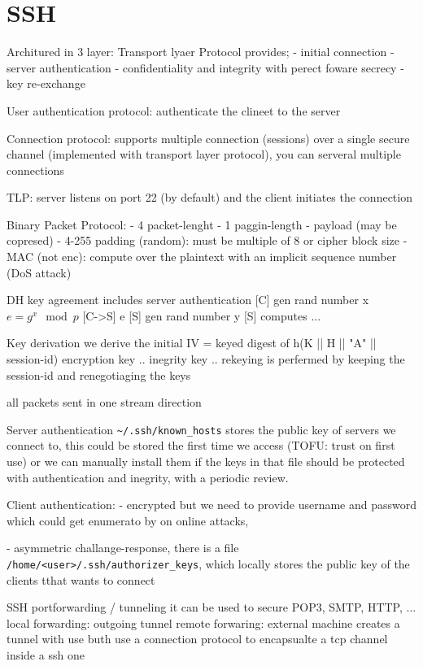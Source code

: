\documentclass[12pt]{article}
\begin{document}
\section{SSH}
Architured in 3 layer:
Transport lyaer Protocol provides;
- initial connection
- server authentication
- confidentiality and integrity with perect foware secrecy
- key re-exchange

User authentication protocol:
authenticate the clineet to the server

Connection protocol:
supports multiple connection (sessions) over a single secure channel (implemented with transport layer protocol), you can serveral multiple connections

TLP:
server listens on port 22 (by default) and the client initiates the connection

Binary Packet Protocol:
- 4 packet-lenght
- 1 paggin-length
- payload (may be copresed)
- 4-255 padding (random): must be multiple of 8 or cipher block size
- MAC (not enc): compute over the plaintext with an implicit sequence number (DoS attack)

DH key agreement 
includes server authentication
[C] gen rand number x   $ e = g^x \mod{p} $
[C->S] e
[S] gen rand number y 
[S] computes
...

Key derivation
we derive the initial IV = keyed digest of h(K || H || "A" || session-id)
encryption key ..
inegrity key ..
rekeying is perfermed by keeping the session-id and renegotiaging the keys

all packets sent in one stream direction

Server authentication
\verb|~/.ssh/known_hosts| stores the public key of servers we connect to, this could be stored the first time we access (TOFU: trust on first use) or we can manually install them
if the keys in that file should be protected with authentication and inegrity, with a periodic review.

Client authentication:
- encrypted but we need to provide username and password which could get enumerato by on online attacks,

- asymmetric challange-response, there is a file \verb|/home/<user>/.ssh/authorizer_keys|, which locally stores the public key of the clients tthat wants to connect


SSH portforwarding / tunneling
it can be used to secure POP3, SMTP, HTTP, ...
local forwarding: outgoing tunnel
remote forwaring: external machine creates a tunnel with use
buth use a connection protocol to encapsualte a tcp channel inside a ssh one
\end{document}
